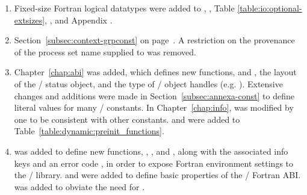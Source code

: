 \begin{enumerate}

\item Fixed-size Fortran logical datatypes were added to ,
      , Table \ref{table:io:optional-extsizes},
      , and Appendix .

\item
  Section~\ref{subsec:context-grpconst} on page~\pageref{subsec:context-grpconst}.
  \newline
  A restriction on the provenance of the process set name supplied to  was removed.

\item { \raggedright Chapter~\ref{chap:abi} was added, which defines new functions,
         and ,
        the layout of the \MPI/ status object,
        and the type of \MPI/ object handles (e.g. ).
      Extensive changes and additions were made in Section~\ref{subsec:annexa-const}
        to define literal values for many \MPI/ constants.
      In Chapter~\ref{chap:info},  was
          modified by one to be consistent with other constants.
       and  were added to
          Table~\ref{table:dynamic:preinit_functions}. }

\item {\sloppy%
   was added to define new functions,
        , ,
        and , along with the associated info keys
        and an error code ,
        in order to expose Fortran environment settings to the \MPI/ library.
       and 
        were added to define basic properties of the \MPI/ Fortran ABI.
       was added to obviate the need for .

}

\end{enumerate}

